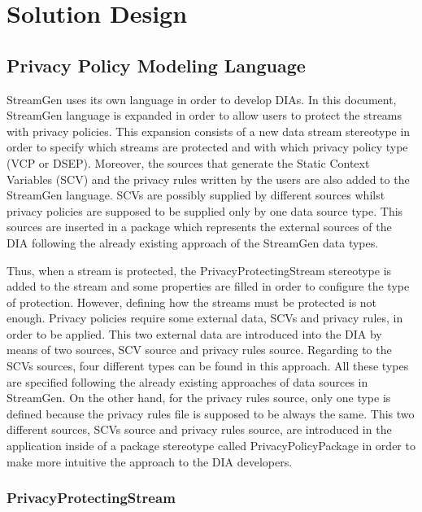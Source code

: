\chapter[Solution Design]{Solution Design}
\label{sec:chapter4}

\section{Privacy Policy Modeling Language}

StreamGen uses its own language in order to develop DIAs. In this document, StreamGen language is expanded in order to allow users to protect the streams with privacy policies. This expansion consists of a new data stream stereotype in order to specify which streams are protected and with which privacy policy type (VCP or DSEP). Moreover, the sources that generate the Static Context Variables (SCV) and the privacy rules written by the users are also added to the StreamGen language. SCVs are possibly supplied by different sources whilst privacy policies are supposed to be supplied only by one data source type. This sources are inserted in a package which represents the external sources of the DIA following the already existing approach of the StreamGen data types.

Thus, when a stream is protected, the PrivacyProtectingStream stereotype is added to the stream and some properties are filled in order to configure the type of protection. However, defining how the streams must be protected is not enough. Privacy policies require some external data, SCVs and privacy rules, in order to be applied. This two external data are introduced into the DIA by means of two sources, SCV source and privacy rules source. Regarding to the SCVs sources, four different types can be found in this approach. All these types are specified following the already existing approaches of data sources in StreamGen. On the other hand, for the privacy rules source, only one type is defined because the privacy rules file is supposed to be always the same. This two different sources, SCVs source and privacy rules source, are introduced in the application inside of a package stereotype called PrivacyPolicyPackage in order to make more intuitive the approach to the DIA developers.

\subsection{PrivacyProtectingStream}

